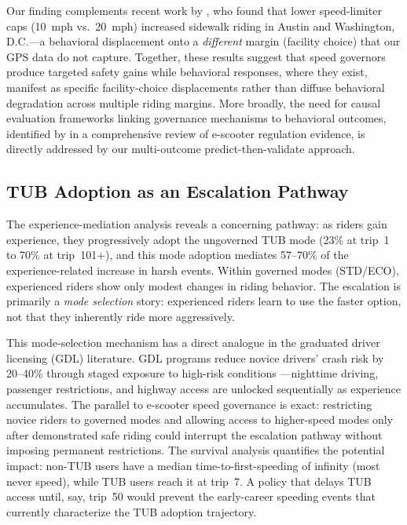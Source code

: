 Our finding complements recent work by \citet{cicchino2023speed}, who found that lower speed-limiter caps (10~mph vs.\ 20~mph) increased sidewalk riding in Austin and Washington, D.C.---a behavioral displacement onto a \textit{different} margin (facility choice) that our GPS data do not capture. Together, these results suggest that speed governors produce targeted safety gains while behavioral responses, where they exist, manifest as specific facility-choice displacements rather than diffuse behavioral degradation across multiple riding margins. More broadly, the need for causal evaluation frameworks linking governance mechanisms to behavioral outcomes, identified by \citet{zhang2024regulation} in a comprehensive review of e-scooter regulation evidence, is directly addressed by our multi-outcome predict-then-validate approach.

\subsection{TUB Adoption as an Escalation Pathway}
\label{sec:disc_escalation}

The experience-mediation analysis reveals a concerning pathway: as riders gain experience, they progressively adopt the ungoverned TUB mode (23\% at trip~1 to 70\% at trip~101+), and this mode adoption mediates 57--70\% of the experience-related increase in harsh events. Within governed modes (STD/ECO), experienced riders show only modest changes in riding behavior. The escalation is primarily a \textit{mode selection} story: experienced riders learn to use the faster option, not that they inherently ride more aggressively.

This mode-selection mechanism has a direct analogue in the graduated driver licensing (GDL) literature. GDL programs reduce novice drivers' crash risk by 20--40\% through staged exposure to high-risk conditions \citep{shope2007graduated}---nighttime driving, passenger restrictions, and highway access are unlocked sequentially as experience accumulates. The parallel to e-scooter speed governance is exact: restricting novice riders to governed modes and allowing access to higher-speed modes only after demonstrated safe riding could interrupt the escalation pathway without imposing permanent restrictions. The survival analysis quantifies the potential impact: non-TUB users have a median time-to-first-speeding of infinity (most never speed), while TUB users reach it at trip~7. A policy that delays TUB access until, say, trip~50 would prevent the early-career speeding events that currently characterize the TUB adoption trajectory.

